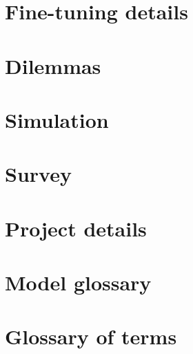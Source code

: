 \documentclass[11pt, a4paper, twoside, openright]{report}
\begin{document}
\chapter{Fine-tuning details}
\label{app:fine-tuning}


\chapter{Dilemmas}
\label{app:dilemmas}


\chapter{Simulation}
\label{app:simulation}


\chapter{Survey}
\label{app:survey}


\chapter{Project details}
\label{app:project-details}


\modelprinttrue
\chapter{Model glossary}
\label{app:models}


\glossaryprinttrue
\chapter{Glossary of terms}
\label{app:glossary}

\end{document}
